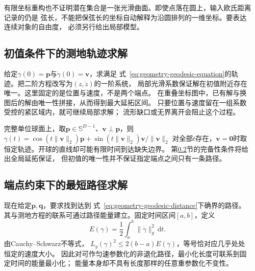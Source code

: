 有限坐标重构也不证明潜在集合是一张光滑曲面。即使点落在圆上，输入欧氏距离记录的仍是
弦长，不能把保弦长的坐标自动解释为沿圆排列的一维坐标。要表达连续对象的自由度，
必须另行给出局部模型。

\subsection{初值条件下的测地轨迹求解}
\label{sec:geometry-geodesic-initial-value}

给定$\gamma(0)=\bm p$与$\dot\gamma(0)=\bm v$，求满足
式~\eqref{eq:geometry-geodesic-equation}的轨迹。把二阶方程改写为$(z,\dot z)$的一阶系统，
局部光滑系数保证解在初值附近存在唯一。这里固定的是位置与速度，不是两个端点。
在重叠坐标图中，已有解与换图后的解由唯一性拼接，从而得到最大延拓区间。
只要位置与速度留在一组系数受控的紧区域内，就可继续局部求解；
流形缺口或无界离开会阻止这个过程。

完整单位球面上，取$\bm p\in\mathbb S^{D-1}$、$\bm v\perp\bm p$，则
$\gamma(t)=\cos(t\lVert\bm v\rVert_2)\bm p
+\sin(t\lVert\bm v\rVert_2)\bm v/\lVert\bm v\rVert_2$
对全部$t$存在，$\bm v=\bm0$时取恒定轨迹。开球的直线却可能有限时间到达缺失边界。
第\ref{sec:geometry-endpoint-minimizing-path}节的完备性条件将给出全局延拓保证，
但初值的唯一性并不保证指定端点之间只有一条路径。

\subsection{端点约束下的最短路径求解}
\label{sec:geometry-endpoint-minimizing-path}

现在给定$\bm p,\bm q$，要求找到达到
式~\eqref{eq:geometry-geodesic-distance}下确界的路径。
其与测地方程的联系可通过路径能量建立。固定时间区间$[a,b]$，定义
\[
 E(\gamma)=\frac12\int_a^b\lVert\dot\gamma\rVert_g^2\,\mathrm dt.
\]
由Cauchy--Schwarz不等式，
$L_g(\gamma)^2\leq2(b-a)E(\gamma)$，等号恰对应几乎处处恒定的速度大小。
因此对可作匀速参数化的非退化路径，最小化长度可联系到固定时间的能量最小化；
能量本身却不具有长度那样的任意重参数化不变性。


